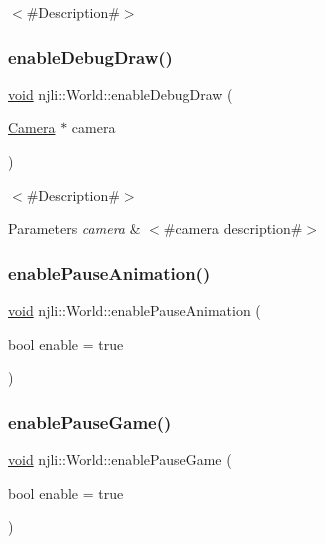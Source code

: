 $<$\#\+Description\#$>$ \mbox{\label{classnjli_1_1_world_ad67785776209cbbaa6140fcc90b4913a}} 
\subsubsection{\texorpdfstring{enable\+Debug\+Draw()}{enableDebugDraw()}}
{\footnotesize\ttfamily \mbox{\hyperlink{_thread_8h_af1e856da2e658414cb2456cb6f7ebc66}{void}} njli\+::\+World\+::enable\+Debug\+Draw (\begin{DoxyParamCaption}\item[{\mbox{\hyperlink{classnjli_1_1_camera}{Camera}} $\ast$}]{camera }\end{DoxyParamCaption})}

$<$\#\+Description\#$>$


\begin{DoxyParams}{Parameters}
{\em camera} & $<$\#camera description\#$>$ \\
\hline
\end{DoxyParams}
\mbox{\label{classnjli_1_1_world_a41b67b3dea3196afa6ff1b0d961b39d2}} 
\subsubsection{\texorpdfstring{enable\+Pause\+Animation()}{enablePauseAnimation()}}
{\footnotesize\ttfamily \mbox{\hyperlink{_thread_8h_af1e856da2e658414cb2456cb6f7ebc66}{void}} njli\+::\+World\+::enable\+Pause\+Animation (\begin{DoxyParamCaption}\item[{bool}]{enable = {\ttfamily true} }\end{DoxyParamCaption})}

\mbox{\label{classnjli_1_1_world_ae8f238cc0f23ce6b8a05ad5a3da555f7}} 
\subsubsection{\texorpdfstring{enable\+Pause\+Game()}{enablePauseGame()}}
{\footnotesize\ttfamily \mbox{\hyperlink{_thread_8h_af1e856da2e658414cb2456cb6f7ebc66}{void}} njli\+::\+World\+::enable\+Pause\+Game (\begin{DoxyParamCaption}\item[{bool}]{enable = {\ttfamily true} }\end{DoxyParamCaption})}

